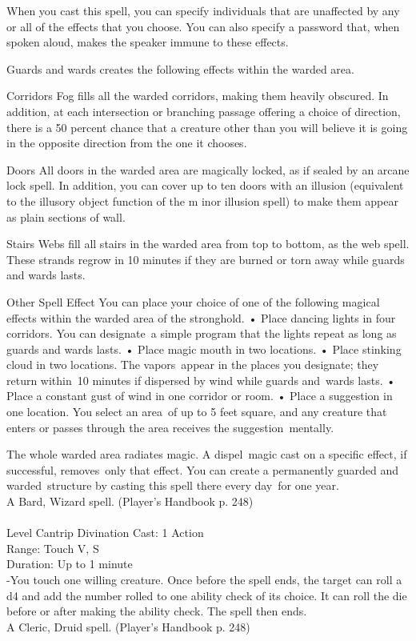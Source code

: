 \documentclass[10pt,twocolumn]{report}
\begin{document}
When you cast this spell, you can specify individuals that are unaffected by any or all of the effects that you choose. You can also specify a password that, when spoken aloud, makes the speaker immune to these effects.

Guards and wards creates the following effects within the warded area.

Corridors
Fog fills all the warded corridors, making them heavily obscured. In addition, at each intersection or branching passage offering a choice of direction, there is a 50 percent chance that a creature other than you will believe it is going in the opposite direction from the one it chooses.

Doors
All doors in the warded area are magically locked, as if sealed by an arcane lock spell. In addition, you can cover up to ten doors with an illusion (equivalent to the illusory object function of the m inor illusion spell) to make them appear as plain sections of wall.

Stairs
Webs fill all stairs in the warded area from top to bottom, as the web spell. These strands regrow in 10 minutes if they are burned or torn away while guards and wards lasts.

Other Spell Effect
You can place your choice of one of the following magical effects within the warded area of the stronghold.
• Place dancing lights in four corridors. You can designate a simple program that the lights repeat as long as
guards and wards lasts.
• Place magic mouth in two locations.
• Place stinking cloud in two locations. The vapors appear in the places you designate; they return within 10 minutes if dispersed by wind while guards and wards lasts.
• Place a constant gust of wind in one corridor or room.
• Place a suggestion in one location. You select an area of up to 5 feet square, and any creature that enters
or passes through the area receives the suggestion mentally.

The whole warded area radiates magic. A dispel magic cast on a specific effect, if successful, removes only that effect.
You can create a permanently guarded and warded structure by casting this spell there every day for one year.\\
A Bard, Wizard spell. (Player's Handbook p. 248) \\


 \\
Level Cantrip \quad Divination \quad Cast: 1 Action\\
Range: Touch \quad V, S\\
Duration: Up to 1 minute \quad \\
-You touch one willing creature. Once before the spell ends, the target can roll a d4 and add the number rolled to one ability check of its choice. It can roll the die before or after making the ability check. The spell then ends.\\
A Cleric, Druid spell. (Player's Handbook p. 248) \\
\end{document}

